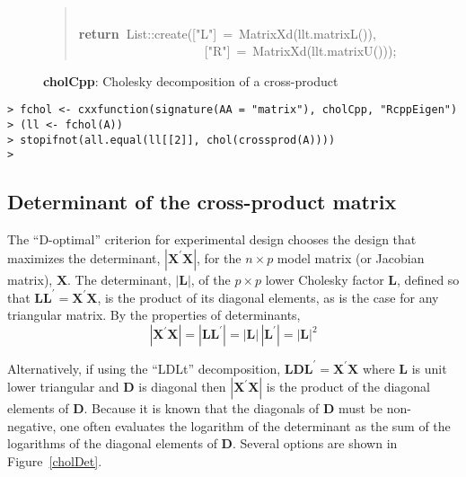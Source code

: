 \documentclass[shortnames,article]{jss}
\newcommand{\hlstd}[1]{\textcolor[rgb]{0,0,0}{#1}}
\newcommand{\hlopt}[1]{\textcolor[rgb]{0,0,0}{#1}}
\newcommand{\hlstr}[1]{\textcolor[rgb]{0.90,0.15,0.15}{#1}}
\newcommand{\hlkwa}[1]{\textcolor[rgb]{0.61,0.13,0.93}{\bf{#1}}}
\newcommand{\hlkwd}[1]{\textcolor[rgb]{0,0,0}{#1}}
\begin{document}
\begin{figure}[htb]
\begin{quote}
    \hlstd{}\hspace*{\fill}\\
    \hlkwa{return\ }\hlstd{List}\hlopt{::}\hlstd{}\hlkwd{create}\hlstd{}\hlopt{(}\hlstd{\textunderscore }\hlopt{{[}}\hlstd{}\hlstr{"L"}\hlstd{}\hlopt{{]}\ =\ }\hlstd{}\hlkwd{MatrixXd}\hlstd{}\hlopt{(}\hlstd{llt}\hlopt{.}\hlstd{}\hlkwd{matrixL}\hlstd{}\hlopt{()),}\hspace*{\fill}\\
    \hlstd{}\hlstd{\ \ \ \ \ \ \ \ \ \ \ \ \ \ \ \ \ \ \ \ }\hlstd{\textunderscore }\hlopt{{[}}\hlstd{}\hlstr{"R"}\hlstd{}\hlopt{{]}\ =\ }\hlstd{}\hlkwd{MatrixXd}\hlstd{}\hlopt{(}\hlstd{llt}\hlopt{.}\hlstd{}\hlkwd{matrixU}\hlstd{}\hlopt{()));}\hlstd{}\hspace*{\fill}
    \normalfont
    \normalsize
  \end{quote}
  \caption{\textbf{cholCpp}: Cholesky decomposition of a cross-product}
  \label{chol}
\end{figure}

\begin{verbatim}
> fchol <- cxxfunction(signature(AA = "matrix"), cholCpp, "RcppEigen")
> (ll <- fchol(A))
> stopifnot(all.equal(ll[[2]], chol(crossprod(A))))
>
\end{verbatim}



\subsection{Determinant of the cross-product matrix}
\label{sec:determinant}

The ``D-optimal'' criterion for experimental design chooses the design
that maximizes the determinant, $|\bm X^\prime\bm X|$, for the
$n\times p$ model matrix (or Jacobian matrix), $\bm X$.  The
determinant, $|\bm L|$, of the $p\times p$ lower Cholesky factor
$\bm L$, defined so that $\bm L\bm L^\prime=\bm X^\prime\bm X$, is
the product of its diagonal elements, as is the case for any
triangular matrix.  By the properties of determinants,
\begin{displaymath}
  |\bm X^\prime\bm X|=|\bm L\bm L^\prime|=|\bm L|\,|\bm L^\prime|=|\bm L|^2
\end{displaymath}

Alternatively, if using the ``LDLt'' decomposition, $\bm L\bm D\bm
L^\prime=\bm X^\prime\bm X$ where $\bm L$ is unit lower triangular and
$\bm D$ is diagonal then $|\bm X^\prime\bm X|$ is the product of the
diagonal elements of $\bm D$.  Because it is known that the diagonals of
$\bm D$ must be non-negative, one often evaluates the logarithm of the
determinant as the sum of the logarithms of the diagonal elements of
$\bm D$.  Several options are shown in Figure~\ref{cholDet}.
\end{document}
